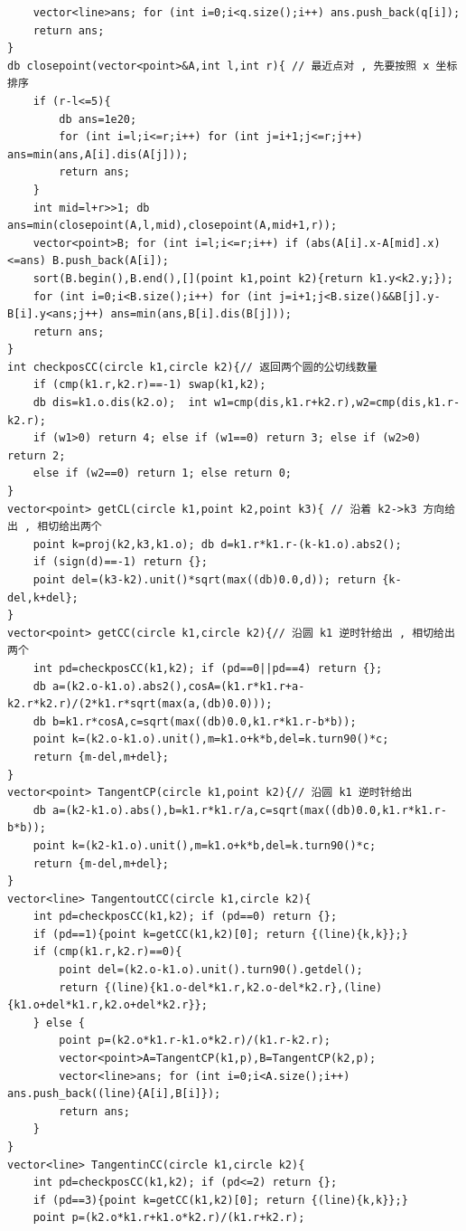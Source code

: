 \documentclass[twoside]{article}
\begin{document}
\begin{lstlisting}
    vector<line>ans; for (int i=0;i<q.size();i++) ans.push_back(q[i]);
    return ans;
}
db closepoint(vector<point>&A,int l,int r){ // 最近点对 , 先要按照 x 坐标排序 
    if (r-l<=5){
        db ans=1e20;
        for (int i=l;i<=r;i++) for (int j=i+1;j<=r;j++) ans=min(ans,A[i].dis(A[j]));
        return ans;
    }
    int mid=l+r>>1; db ans=min(closepoint(A,l,mid),closepoint(A,mid+1,r));
    vector<point>B; for (int i=l;i<=r;i++) if (abs(A[i].x-A[mid].x)<=ans) B.push_back(A[i]);
    sort(B.begin(),B.end(),[](point k1,point k2){return k1.y<k2.y;});
    for (int i=0;i<B.size();i++) for (int j=i+1;j<B.size()&&B[j].y-B[i].y<ans;j++) ans=min(ans,B[i].dis(B[j]));
    return ans;
}
int checkposCC(circle k1,circle k2){// 返回两个圆的公切线数量
    if (cmp(k1.r,k2.r)==-1) swap(k1,k2);
    db dis=k1.o.dis(k2.o);  int w1=cmp(dis,k1.r+k2.r),w2=cmp(dis,k1.r-k2.r);
    if (w1>0) return 4; else if (w1==0) return 3; else if (w2>0) return 2; 
    else if (w2==0) return 1; else return 0;
}
vector<point> getCL(circle k1,point k2,point k3){ // 沿着 k2->k3 方向给出 , 相切给出两个 
    point k=proj(k2,k3,k1.o); db d=k1.r*k1.r-(k-k1.o).abs2();
    if (sign(d)==-1) return {};
    point del=(k3-k2).unit()*sqrt(max((db)0.0,d)); return {k-del,k+del};
}
vector<point> getCC(circle k1,circle k2){// 沿圆 k1 逆时针给出 , 相切给出两个 
    int pd=checkposCC(k1,k2); if (pd==0||pd==4) return {};
    db a=(k2.o-k1.o).abs2(),cosA=(k1.r*k1.r+a-k2.r*k2.r)/(2*k1.r*sqrt(max(a,(db)0.0)));
    db b=k1.r*cosA,c=sqrt(max((db)0.0,k1.r*k1.r-b*b));
    point k=(k2.o-k1.o).unit(),m=k1.o+k*b,del=k.turn90()*c;
    return {m-del,m+del};
} 
vector<point> TangentCP(circle k1,point k2){// 沿圆 k1 逆时针给出 
    db a=(k2-k1.o).abs(),b=k1.r*k1.r/a,c=sqrt(max((db)0.0,k1.r*k1.r-b*b));
    point k=(k2-k1.o).unit(),m=k1.o+k*b,del=k.turn90()*c;
    return {m-del,m+del};
} 
vector<line> TangentoutCC(circle k1,circle k2){
    int pd=checkposCC(k1,k2); if (pd==0) return {}; 
    if (pd==1){point k=getCC(k1,k2)[0]; return {(line){k,k}};}
    if (cmp(k1.r,k2.r)==0){
        point del=(k2.o-k1.o).unit().turn90().getdel();
        return {(line){k1.o-del*k1.r,k2.o-del*k2.r},(line){k1.o+del*k1.r,k2.o+del*k2.r}};
    } else {
        point p=(k2.o*k1.r-k1.o*k2.r)/(k1.r-k2.r);
        vector<point>A=TangentCP(k1,p),B=TangentCP(k2,p);
        vector<line>ans; for (int i=0;i<A.size();i++) ans.push_back((line){A[i],B[i]}); 
        return ans;
    }
}
vector<line> TangentinCC(circle k1,circle k2){
    int pd=checkposCC(k1,k2); if (pd<=2) return {};
    if (pd==3){point k=getCC(k1,k2)[0]; return {(line){k,k}};} 
    point p=(k2.o*k1.r+k1.o*k2.r)/(k1.r+k2.r);

\end{lstlisting}
\end{document}
